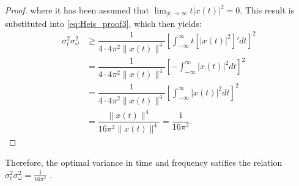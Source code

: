\begin{proof}
where it has been assumed that $\lim_{|t| \to \infty} t |x(t)|^2 = 0$. This result is substituted into \eqref{eq:Heis_proof3}, which then yields:
\begin{align*}
\sigma_t^2 \sigma_\omega^2 &\geq \dfrac{1}{4 \cdot 4\pi^2 \|x(t)\|^4} \left[ \int_{-\infty}^\infty t \left[ |x(t)|^2 \right]' dt \right]^2 \\
&= \dfrac{1}{4 \cdot 4\pi^2 \|x(t)\|^4} \left[ - \int_{-\infty}^\infty |x(t)|^2 dt \right]^2 \\
&= \dfrac{1}{4 \cdot 4\pi^2 \|x(t)\|^4} \left[ \int_{-\infty}^\infty |x(t)|^2 dt \right]^2 \\
&= \dfrac{\|x(t)\|^4}{16\pi^2 \|x(t)\|^4} = \dfrac{1}{16\pi^2}.
\end{align*}
\end{proof}

Therefore, the optimal variance in time and frequency satifies the relation $\sigma_t^2\sigma_\omega^2 = \frac{1}{16\pi^2}$ .